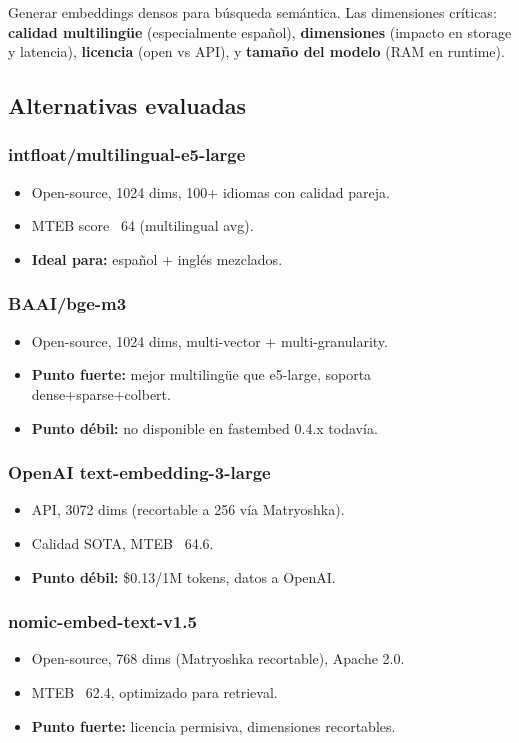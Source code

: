 \documentclass[11pt,a4paper]{article}
\begin{document}
Generar embeddings densos para búsqueda semántica. Las dimensiones críticas: \textbf{calidad multilingüe} (especialmente español), \textbf{dimensiones} (impacto en storage y latencia), \textbf{licencia} (open vs API), y \textbf{tamaño del modelo} (RAM en runtime).

\subsection{Alternativas evaluadas}

\subsubsection{intfloat/multilingual-e5-large}
\begin{itemize}[leftmargin=*,itemsep=0pt]
\item Open-source, 1024 dims, 100+ idiomas con calidad pareja.
\item MTEB score ~64 (multilingual avg).
\item \textbf{Ideal para:} español + inglés mezclados.
\end{itemize}

\subsubsection{BAAI/bge-m3}
\begin{itemize}[leftmargin=*,itemsep=0pt]
\item Open-source, 1024 dims, multi-vector + multi-granularity.
\item \textbf{Punto fuerte:} mejor multilingüe que e5-large, soporta dense+sparse+colbert.
\item \textbf{Punto débil:} no disponible en fastembed 0.4.x todavía.
\end{itemize}

\subsubsection{OpenAI text-embedding-3-large}
\begin{itemize}[leftmargin=*,itemsep=0pt]
\item API, 3072 dims (recortable a 256 vía Matryoshka).
\item Calidad SOTA, MTEB ~64.6.
\item \textbf{Punto débil:} \$0.13/1M tokens, datos a OpenAI.
\end{itemize}

\subsubsection{nomic-embed-text-v1.5}
\begin{itemize}[leftmargin=*,itemsep=0pt]
\item Open-source, 768 dims (Matryoshka recortable), Apache 2.0.
\item MTEB ~62.4, optimizado para retrieval.
\item \textbf{Punto fuerte:} licencia permisiva, dimensiones recortables.
\end{itemize}
\end{document}
